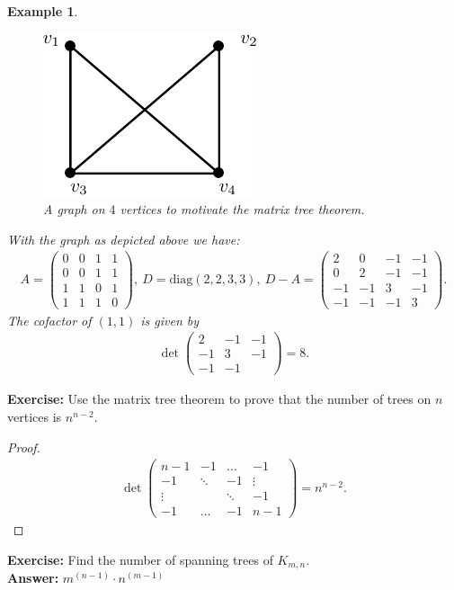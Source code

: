 \documentclass[12pt,a4paper]{article}
\newtheorem{exmp}{Example}[section]
\theoremstyle{definition}
\begin{document}
\begin{exmp} \

\begin{figure}[hbtp]
\centering
\includegraphics[scale=1]{images/graph34.pdf}
\caption{A graph on $4$ vertices to motivate the matrix tree theorem.}
\end{figure}
With the graph as depicted above we have:
\begin{align*}
A = \begin{pmatrix}
0 & 0 & 1 & 1 \\
0 & 0 & 1 & 1 \\
1 & 1 & 0 & 1 \\
1 & 1 & 1 & 0 
\end{pmatrix}, \ 
D= \text{diag}(2,2,3,3), \
D-A = \begin{pmatrix}
2 & 0 & -1 & -1 \\
0 & 2 & -1 & -1 \\
-1 & -1 & 3 & -1 \\
-1 & -1 & -1 & 3
\end{pmatrix}. 
\end{align*}
The cofactor of $(1,1)$ is given by 
\begin{align*}
\det \begin{pmatrix}
2 & -1 & -1 \\
-1 & 3 & -1 \\
-1 & -1 %
\end{pmatrix} = 8.
\end{align*}
\end{exmp}
\textbf{Exercise:} Use the matrix tree theorem to prove that the number of trees on $n$ vertices is $n^{n-2}$. 
\begin{proof}
\begin{align*}
\det \begin{pmatrix}
n-1 & -1 & \dots & -1 \\
-1 & \ddots & -1 &  \vdots \\
\vdots & & \ddots  & -1 \\
-1 & \dots & -1 & n-1
\end{pmatrix} = n^{n-2}.
\end{align*}
\end{proof}
\textbf{Exercise:} Find the number of spanning trees of $K_{m,n}.$ \\
\textbf{Answer:} $m^{(n-1)} \cdot n^{(m-1)}$
\newpage
\end{document}
